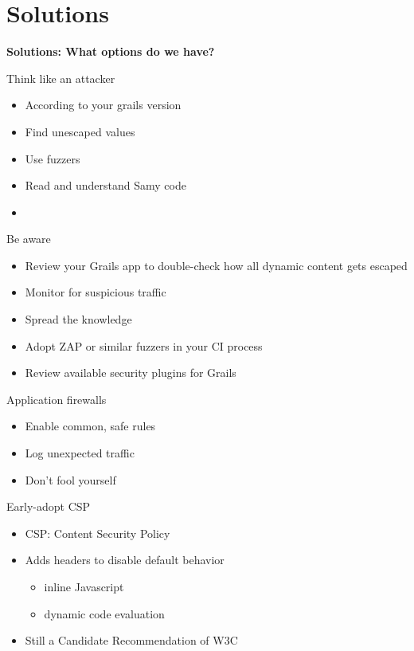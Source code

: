 
\section{Solutions}

\begin{frame}[plain]
    \begin{center}
      \Huge\bfseries
      Solutions: What options do we have?
    \end{center}
\end{frame}

\begin{frame}{Think like an attacker}
  \begin{itemize}[<+-| alert@+>]
    \item According to your grails version
    \item Find unescaped values
    \item Use fuzzers
    \item Read and understand Samy code
    \item 
  \end{itemize}
\end{frame}

\begin{frame}{Be aware}
  \begin{itemize}[<+-| alert@+>]
    \item Review your Grails app to double-check how all dynamic content gets escaped
    \item Monitor for suspicious traffic
    \item Spread the knowledge
    \item Adopt ZAP or similar fuzzers in your CI process
    \item Review available security plugins for Grails
  \end{itemize}
\end{frame}

\begin{frame}{Application firewalls}
 \begin{itemize}[<+-| alert@+>]
   \item Enable common, safe rules
   \item Log unexpected traffic
   \item Don't fool yourself
 \end{itemize}
\end{frame}

\begin{frame}{Early-adopt CSP}
 \begin{itemize}[<+-| alert@+>]
  \item CSP: Content Security Policy
  \item Adds headers to disable default behavior
   \begin{itemize}[<+-| alert@+>]
     \item inline Javascript
     \item dynamic code evaluation
   \end{itemize}
  \item Still a Candidate Recommendation of W3C
 \end{itemize}
\end{frame}
